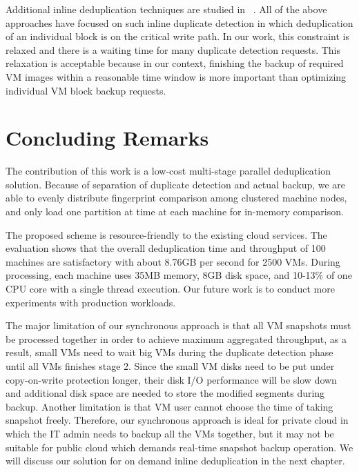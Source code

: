 Additional inline deduplication techniques are studied in ~\cite{sparseindex09,Guo2011,Srinivasan2012}.
All of the above approaches have focused on
such inline duplicate detection in which  deduplication of an individual block  is on the critical write path.
In our work, this constraint is relaxed and
there is a waiting time for many duplicate detection requests. This relaxation is acceptable because
in our context, finishing the backup of required VM images within a reasonable time window is more
important than optimizing individual VM block  backup requests.

\section{Concluding Remarks}
\label{offline:concl}
The contribution  of this work is a low-cost multi-stage parallel deduplication solution.
Because of separation  of duplicate detection and actual backup,
we are able to evenly distribute  fingerprint comparison among clustered machine
nodes, and only load one partition at time at each machine for in-memory comparison.

The proposed scheme is resource-friendly to the existing cloud services.
The evaluation shows that the overall 
deduplication time and throughput of 100 machines  are satisfactory with 
about 8.76GB per second for 2500 VMs. During processing, each machine uses 
35MB memory, 8GB disk space, and 10-13\% of one CPU core with a single thread  execution.
Our future work is to conduct more experiments with production workloads.

The major limitation of our synchronous approach is that all VM snapshots must be processed together
in order to achieve maximum aggregated throughput, as a result, small VMs need to wait big VMs during
the duplicate detection phase until all VMs finishes stage 2. Since the small VM disks 
need to be put under copy-on-write protection longer, their disk I/O performance will be slow down
and  additional disk space are needed to store the modified segments during backup. Another limitation
is that VM user cannot choose the time of taking snapshot freely. Therefore, our synchronous approach 
is ideal for private cloud in which the IT admin needs to backup all the VMs together, but it may not
be suitable 
for public cloud which demands real-time snapshot backup operation. We will discuss our solution
for on demand inline deduplication in the next chapter.

